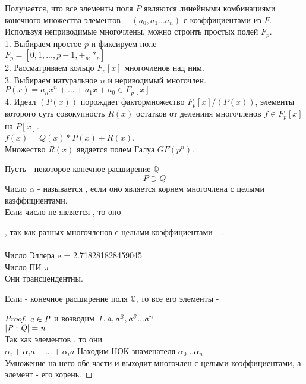 Получается, что все элементы поля $P$ являются линейными комбинациями
конечного множества элементов $\quad(a_{0}, a_{1}...a_{n})$ 
с коэффициентами из $F$.\\


Используя неприводимые многочлены, можно строить 
 простых полей $F_{p}$.\\
1. Выбираем простое $p$ и фиксируем поле\\
$F_{p} = [ {\overline{0}, \overline{1}, ... , \overline{p - 1}}, +_{p}, \ast{_p}]$\\
2. Рассматриваем кольцо $F_{p}[x]$ многочленов над ним.\\
3. Выбираем натуральное $n$ и нериводимый многочлен.\\
$P(x) = a_{n}x^{n} + ... + a_{1}x + a_{0} \in F_{p}[x]$ \\
4. Идеал $(P(x))$ порождает фактормножество $F_{p}[x]/(P(x))$,
элементы которого суть совокупность ${R(x)}$ остатков от
делениия многочленов $f\in{F_{p}[x]}$ на $P[x]$.\\
$f(x) = Q(x)\ast{P(x)} + R(x)$.\\

Множество ${R(x)}$ явдяется полем Галуа $GF(p^{n})$.\\

\begin{defin}
	Пусть  - некоторое конечное расширение $\mathbb Q$\\
	\[P \supset Q \]
	Число $\alpha$ - называется , если оно является корнем
	многочлена с целыми каэффициентами. \\
	Если число не является , то оно 
\end{defin}

, так как разных многочленов с целыми
коэффициентами - . \\
 \\
Число Эллера {\bk e} = 2.718281828459045 \\
Число ПИ $\pi $ \\
Они трансцендентны.\\

\begin{theorem}
	Если  - конечное расширение поля $\mathbb {Q}$, то все его элементы -
\end{theorem}

\begin{proof}
	$\mathit {a \in P}$ и возводим $\mathit {1, a, a^2, a^3...a^n}$ \\
	$\mathit {|P:Q| = n}$ \\
	Так как элементов , то они  \\
	$\alpha_{i} + \alpha_{i}a + ... + \alpha_{i}a$ %
	Находим НОК знаменателя $\alpha_{0} ... \alpha_{n}$ \\
	Умножение на него обе части и выходит многочлен с целыми коэффициентами, а
	элемент  - его корень.
\end{proof}